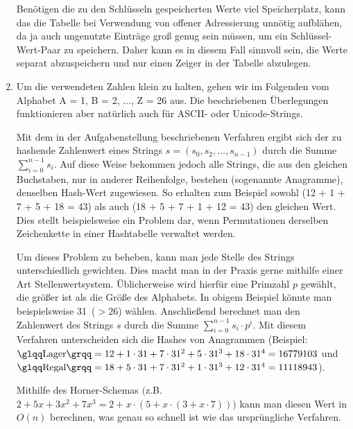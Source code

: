 \documentclass[11pt,a4paper]{article}
\begin{document}
\begin{loesung}
\begin{enumerate}
        Benötigen die zu den Schlüsseln gespeicherten Werte viel Speicherplatz, kann das die Tabelle bei Verwendung von offener Adressierung unnötig aufblähen, da ja auch ungenutzte Einträge groß genug sein müssen, um ein Schlüssel-Wert-Paar zu speichern.
        Daher kann es in diesem Fall sinnvoll sein, die Werte separat abzuspeichern und nur einen Zeiger in der Tabelle abzulegen.
        
        \item 
        Um die verwendeten Zahlen klein zu halten, gehen wir im Folgenden vom Alphabet A = 1, B = 2, $\ldots$, Z = 26 aus.
        Die beschriebenen Überlegungen funktionieren aber natürlich auch für ASCII- oder Unicode-Strings.

        Mit dem in der Aufgabenstellung beschriebenen Verfahren ergibt sich der zu hashende Zahlenwert eines Strings $s = (s_0, s_2, \ldots, s_{n - 1})$ durch die Summe $\sum_{i = 0}^{n - 1} s_i$.
        Auf diese Weise bekommen jedoch alle Strings, die aus den gleichen Buchstaben, nur in anderer Reihenfolge, bestehen (sogenannte Anagramme), denselben Hash-Wert zugewiesen.
        So erhalten zum Beispiel sowohl  (12 + 1 + 7 + 5 + 18 = 43) als auch  (18 + 5 + 7 + 1 + 12 = 43) den gleichen Wert.
        Dies stellt beispielsweise ein Problem dar, wenn Permutationen derselben Zeichenkette in einer Hashtabelle verwaltet werden.

        Um dieses Problem zu beheben, kann man jede Stelle des Strings unterschiedlich gewichten.
        Dies macht man in der Praxis gerne mithilfe einer Art Stellenwertsystem.
        Üblicherweise wird hierfür eine Primzahl $p$ gewählt, die größer ist als die Größe des Alphabets.
        In obigem Beispiel könnte man beispielsweise 31~($> 26$) wählen.
        Anschließend berechnet man den Zahlenwert des Strings $s$ durch die Summe $\sum_{i = 0}^{n - 1} s_i \cdot p^i$.
        Mit diesem Verfahren unterscheiden sich die Hashes von Anagrammen (Beispiel: $\text{\quotes{Lager}} = 12 + 1 \cdot 31 + 7 \cdot 31^2 + 5 \cdot 31^3 + 18 \cdot 31^4 = 16779103$ und $\text{\quotes{Regal}} = 18 + 5 \cdot 31 + 7 \cdot 31^2 + 1 \cdot 31^3 + 12 \cdot 31^4 = 11118943$).

        Mithilfe des Horner-Schemas $\big($z.B. $2+ 5x + 3x^2 + 7x^3 = 2 + x \cdot (5 + x \cdot (3 + x \cdot 7))$$\big)$ kann man diesen Wert in $O(n)$ berechnen, was genau so schnell ist wie das ursprüngliche Verfahren.

    \end{enumerate}
\end{loesung}
\end{document}
